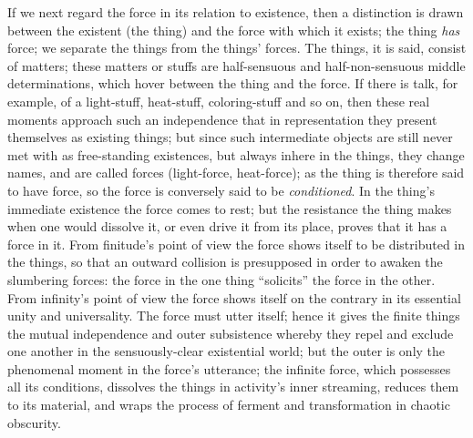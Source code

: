 \documentclass[12pt]{book}
\begin{document}
If we next regard the force in its relation to existence, then a distinction
is drawn between the existent (the thing) and the force with which it
exists; the thing \emph{has} force; we separate the things from the things'
forces. The things, it is said, consist of matters; these matters or stuffs
are half-sensuous and half-non-sensuous middle determinations, which hover
between the thing and the force. If there is talk, for example, of a
light-stuff, heat-stuff, coloring-stuff and so on, then these real moments
approach such an independence that in representation they present themselves
as existing things; but since such intermediate objects are still never met
with as free-standing existences, but always inhere in the things, they
change names, and are called forces (light-force, heat-force); as the thing
is therefore said to have force, so the force is conversely said to be
\emph{conditioned}. In the thing's immediate existence the force comes to
rest; but the resistance the thing makes when one would dissolve it, or even
drive it from its place, proves that it has a force in it. From finitude's
point of view the force shows itself to be distributed in the things, so
that an outward collision is presupposed in order to awaken the slumbering
forces: the force in the one thing ``solicits'' the force in the other. From
infinity's point of view the force shows itself on the contrary in its
essential unity and universality. The force must utter itself; hence it
gives the finite things the mutual independence and outer subsistence
whereby they repel and exclude one another in the sensuously-clear
existential world; but the outer is only the phenomenal moment in the
force's utterance; the infinite force, which possesses all its conditions,
dissolves the things in activity's inner streaming, reduces them to its
material, and wraps the process of ferment and transformation in chaotic
obscurity.
\end{document}
